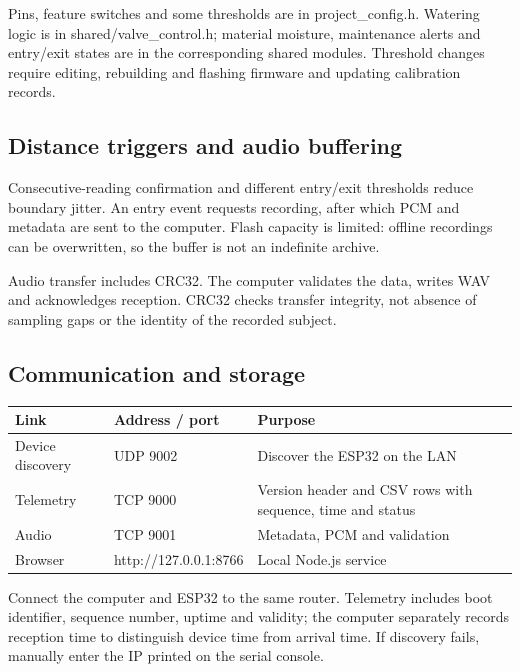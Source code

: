 \documentclass[10pt,a4paper]{article}
\begin{document}
Pins, feature switches and some thresholds are in project\_config.h. Watering logic is in shared/valve\_control.h; material moisture, maintenance alerts and entry/exit states are in the corresponding shared modules. Threshold changes require editing, rebuilding and flashing firmware and updating calibration records.


\subsection{Distance triggers and audio buffering}

Consecutive-reading confirmation and different entry/exit thresholds reduce boundary jitter. An entry event requests recording, after which PCM and metadata are sent to the computer. Flash capacity is limited: offline recordings can be overwritten, so the buffer is not an indefinite archive.


Audio transfer includes CRC32. The computer validates the data, writes WAV and acknowledges reception. CRC32 checks transfer integrity, not absence of sampling gaps or the identity of the recorded subject.




\subsection{Communication and storage}

\begin{longtable}{>{\raggedright\arraybackslash}p{42mm}>{\raggedright\arraybackslash}p{59mm}>{\raggedright\arraybackslash}p{58mm}}
\toprule
\textbf{Link} & \textbf{Address / port} & \textbf{Purpose}\\\midrule\endhead
Device discovery & UDP 9002 & Discover the ESP32 on the LAN\\
Telemetry & TCP 9000 & Version header and CSV rows with sequence, time and status\\
Audio & TCP 9001 & Metadata, PCM and validation\\
Browser & http://127.0.0.1:8766 & Local Node.js service\\
\bottomrule\end{longtable}

Connect the computer and ESP32 to the same router. Telemetry includes boot identifier, sequence number, uptime and validity; the computer separately records reception time to distinguish device time from arrival time. If discovery fails, manually enter the IP printed on the serial console.
\end{document}
